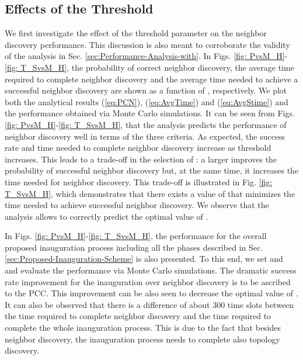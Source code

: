 \documentclass[10pt,english,two column]{IEEEtran}
\begin{document}
\subsection{Effects of the Threshold }

We first investigate the effect of the threshold parameter 
on the neighbor discovery performance. This discussion is also meant
to corroborate the validity of the analysis in Sec. \ref{sec:Performance-Analysis-with}.
In Figs. \ref{fig: PvsM_H}-\ref{fig: T_SvsM_H}, the probability
of correct neighbor discovery, the average time required to complete
neighbor discovery and the average time needed to achieve a successful
neighbor discovery are shown as a function of , respectively.
We plot both the analytical results (\ref{eq:PCN}), (\ref{eq:AvgTime})
and (\ref{eq:AvgStime}) and the performance obtained via Monte Carlo
simulations. It can be seen from Figs. \ref{fig: PvsM_H}-\ref{fig: T_SvsM_H},
that the analysis predicts the performance of neighbor discovery well
in terms of the three criteria. As expected, the success rate and
time needed to complete neighbor discovery increase as threshold 
increases. This leads to a trade-off in the selection of :
a larger  improves the probability of successful neighbor
discovery but, at the same time, it increases the time needed for
neighbor discovery. This trade-off is illustrated in Fig. \ref{fig: T_SvsM_H},
which demonstrates that there exists a value of  that minimizes
the time needed to achieve successful neighbor discovery. We observe
that the analysis allows to correctly predict the optimal value of
. 

In Figs. \ref{fig: PvsM_H}-\ref{fig: T_SvsM_H}, the performance
for the overall proposed inauguration process including all the phases
described in Sec. \ref{sec:Proposed-Inauguration-Scheme} is also
presented. To this end, we set  and  and evaluate
the performance via Monte Carlo simulations. The dramatic success
rate improvement for the inauguration over neighbor discovery is to
be ascribed to the PCC. This improvement can be also seen to decrease
the optimal value of . It can also be observed that there
is a difference of about 300 time slots between the time required
to complete neighbor discovery and the time required to complete the
whole inauguration process. This is due to the fact that besides neighbor
discovery, the inauguration process needs to complete also topology
discovery. 
\end{document}
